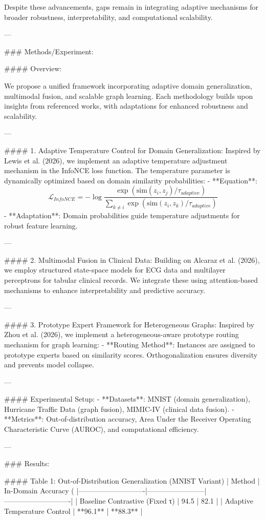 Despite these advancements, gaps remain in integrating adaptive mechanisms for broader robustness, interpretability, and computational scalability.

---

### Methods/Experiment:

#### Overview:

We propose a unified framework incorporating adaptive domain generalization, multimodal fusion, and scalable graph learning. Each methodology builds upon insights from referenced works, with adaptations for enhanced robustness and scalability.

---

#### 1. Adaptive Temperature Control for Domain Generalization:
Inspired by Lewis et al. (2026), we implement an adaptive temperature adjustment mechanism in the InfoNCE loss function. The temperature parameter is dynamically optimized based on domain similarity probabilities:
- **Equation**:  
    \[
    \mathcal{L}_{InfoNCE} = -\log \frac{\exp(\mathrm{sim}(z_i, z_j)/\tau_{adaptive})}{\sum_{k \neq i}\exp(\mathrm{sim}(z_i, z_k)/\tau_{adaptive})}
    \]
- **Adaptation**: Domain probabilities guide temperature adjustments for robust feature learning.

---

#### 2. Multimodal Fusion in Clinical Data:
Building on Alcaraz et al. (2026), we employ structured state-space models for ECG data and multilayer perceptrons for tabular clinical records. We integrate these using attention-based mechanisms to enhance interpretability and predictive accuracy.

---

#### 3. Prototype Expert Framework for Heterogeneous Graphs:
Inspired by Zhou et al. (2026), we implement a heterogeneous-aware prototype routing mechanism for graph learning:
- **Routing Method**: Instances are assigned to prototype experts based on similarity scores. Orthogonalization ensures diversity and prevents model collapse.

---

#### Experimental Setup:
- **Datasets**: MNIST (domain generalization), Hurricane Traffic Data (graph fusion), MIMIC-IV (clinical data fusion).
- **Metrics**: Out-of-distribution accuracy, Area Under the Receiver Operating Characteristic Curve (AUROC), and computational efficiency.

---

### Results:

#### Table 1: Out-of-Distribution Generalization (MNIST Variant)
| Method                     | In-Domain Accuracy (%
|----------------------------|------------------------|----------------------------|
| Baseline Contrastive (Fixed τ) | 94.5                   | 82.1                       |
| Adaptive Temperature Control | **96.1**              | **88.3**                   |

